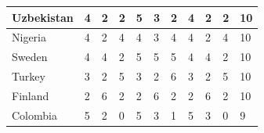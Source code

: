 \documentclass[12pt]{article}  %
\begin{document}
\begin{subappendices}
\begin{longtable}{|l|l|l|l|l|l|l|l|l|l|l|}
	\hline
	Uzbekistan                                                     & 4                                                 & 2                                                 & 2                                                 & 5                                                 & 3                                                 & 2                                                 & 4    & 2      & 2      & 10     \\ 
	\hline
	Nigeria                                                        & 4                                                 & 2                                                 & 4                                                 & 4                                                 & 3                                                 & 4                                                 & 4    & 2      & 4      & 10     \\ 
	\hline
	Sweden                                                         & 4                                                 & 4                                                 & 2                                                 & 5                                                 & 5                                                 & 5                                                 & 4    & 4      & 2      & 10     \\ 
	\hline
	Turkey                                                         & 3                                                 & 2                                                 & 5                                                 & 3                                                 & 2                                                 & 6                                                 & 3    & 2      & 5      & 10     \\ 
	\hline
	Finland                                                        & 2                                                 & 6                                                 & 2                                                 & 2                                                 & 6                                                 & 2                                                 & 2    & 6      & 2      & 10     \\ 
	\hline
	Colombia                                                       & 5                                                 & 2                                                 & 0                                                 & 5                                                 & 3                                                 & 1                                                 & 5    & 3      & 0      & 9      \\ 

\end{longtable}
\end{subappendices}
\end{document}
